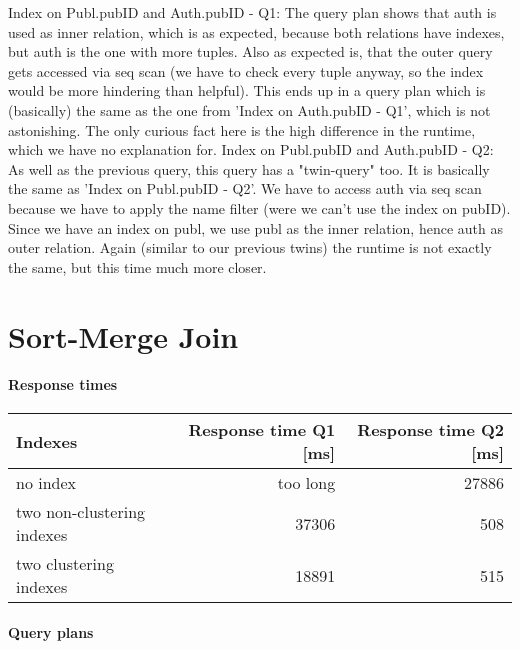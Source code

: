 \documentclass[11pt]{scrartcl}
\begin{document}
Index on Publ.pubID and Auth.pubID - Q1:
The query plan shows that auth is used as inner relation, which is as expected, because both relations have indexes, but auth is the one with more tuples. Also as expected is, that the outer query gets accessed via seq scan (we have to check every tuple anyway, so the index would be more hindering than helpful). This ends up in a query plan which is (basically) the same as the one from 'Index on Auth.pubID - Q1', which is not astonishing. The only curious fact here is the high difference in the runtime, which we have no explanation for.
Index on Publ.pubID and Auth.pubID - Q2:
As well as the previous query, this query has a "twin-query" too. It is basically the same as 'Index on Publ.pubID - Q2'. We have to access auth via seq scan because we have to apply the name filter (were we can't use the index on pubID). Since we have an index on publ, we use publ as the inner relation, hence auth as outer relation. Again (similar to our previous twins) the runtime is not exactly the same, but this time much more closer.

\section{Sort-Merge Join}

\paragraph{Response times}

\begin{flushleft}
\begin{tabular}{l|r|r}
  Indexes & Response time Q1 [ms] & Response time Q2 [ms] \\
  \hline
  no index & too long & 27886 \\
  two non-clustering indexes & 37306 & 508 \\
  two clustering indexes & 18891 & 515  \\
\end{tabular}
\end{flushleft}

\paragraph{Query plans}\mbox{}\\
\end{document}
